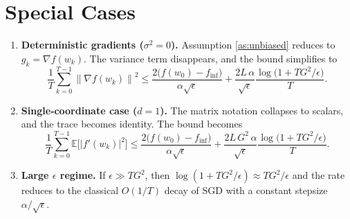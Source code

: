 \documentclass{article}
\newcommand{\E}{\mathbb{E}}
\newcommand{\norm}[1]{\left\lVert#1\right\rVert}
\begin{document}
\section*{Special Cases}
\begin{enumerate}
\item \textbf{Deterministic gradients ($\sigma^{2}=0$).}  
Assumption \ref{as:unbiased} reduces to $g_{k}=\nabla f(w_{k})$. The variance term disappears, and the bound simplifies to
\[
\frac{1}{T}\sum_{k=0}^{T-1}\norm{\nabla f(w_{k})}^{2}
\le
\frac{2\big(f(w_{0})-f_{\inf}\big)}{\alpha\sqrt{\epsilon}}
+\frac{2L\,\alpha}{\sqrt{\epsilon}}\frac{\log\!\big(1+TG^{2}/\epsilon\big)}{T}.
\]

\item \textbf{Single‑coordinate case ($d=1$).}  
The matrix notation collapses to scalars, and the trace becomes identity. The bound becomes
\[
\frac{1}{T}\sum_{k=0}^{T-1}\E\!\big[|f'(w_{k})|^{2}\big]
\le
\frac{2\big(f(w_{0})-f_{\inf}\big)}{\alpha\sqrt{\epsilon}}
+\frac{2L\,G^{2}\,\alpha}{\sqrt{\epsilon}}\frac{\log\!\big(1+TG^{2}/\epsilon\big)}{T}.
\]

\item \textbf{Large $\epsilon$ regime.}  
If $\epsilon\gg TG^{2}$, then $\log(1+TG^{2}/\epsilon)\approx TG^{2}/\epsilon$ and the rate reduces to the classical $O(1/T)$ decay of SGD with a constant stepsize $\alpha/\sqrt{\epsilon}$.
\end{enumerate}
\end{document}
